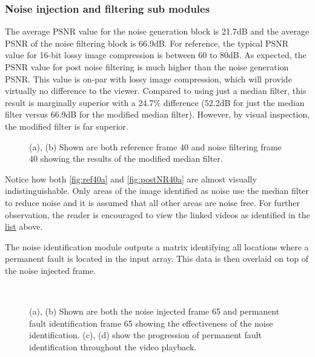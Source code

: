 \subsubsection{Noise injection and filtering sub modules}
\par The average PSNR value for the noise generation block is 21.7dB and the average PSNR of the noise filtering block is 66.9dB. For reference, the typical PSNR value for 16-bit lossy image  compression is between 60 to 80dB\cite{welstead_1999}. As expected, the PSNR value for post noise filtering is much higher than the noise generation PSNR. This value is on-par with lossy image compression, which will provide virtually no difference to the viewer. Compared to using just a median filter, this result is marginally superior with a 24.7\% difference (52.2dB for just the median filter versus 66.9dB for the modified median filter). However, by visual inspection, the modified filter is far superior.
\begin{figure}[H]
    \hfill
    \caption{(a), (b) Shown are both reference frame 40 and noise filtering frame 40 showing the results of the modified median filter.}
    \label{fig:ref-postNR40}
\end{figure}
\par Notice how both \autoref{fig:ref40a} and \autoref{fig:postNR40a} are almost visually indistinguishable. Only areas of the image identified as noise use the median filter to reduce noise and it is assumed that all other areas are noise free. For further observation, the reader is encouraged to view the linked videos as identified in the \hyperref[list:urlList]{list} above.
\par The noise identification module outputs a matrix identifying all locations where a permanent fault is located in the input array. This data is then overlaid on top of the noise injected frame.
\begin{figure}[H]
    \hfill
    \\
    \hfill
    \caption{(a), (b) Shown are both the noise injected frame 65 and permanent fault identification frame 65 showing the effectiveness of the noise identification. (c), (d) show the progression of permanent fault identification throughout the video playback.}
    \label{fig:noisy-ID65}
\end{figure}
